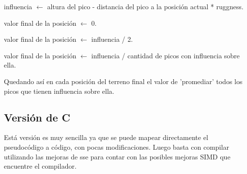 \begin{algorithm}
\begin{algorithmic}

		\State influencia $\gets$ altura del pico - distancia del pico a la posición actual * ruggness.
	\EndFor
	
		\State valor final de la posición $\gets$ 0.
	
		\State valor final de la posición $\gets$ influencia / 2.
	
		\State valor final de la posición $\gets$ influencia / cantidad de picos con influencia sobre ella.
		
	\EndIf

\EndFor

\end{algorithmic}
\end{algorithm}

Quedando así en cada posición del terreno final el valor de 'promediar' todos los picos que tienen influencia sobre ella.

\subsection{Versión de C}
Está versión es muy sencilla ya que se puede mapear directamente el pseudocódigo a código, con pocas modificaciones. Luego basta con compilar utilizando las mejoras de sse para contar con las posibles mejoras SIMD que encuentre el compilador.

\newpage
